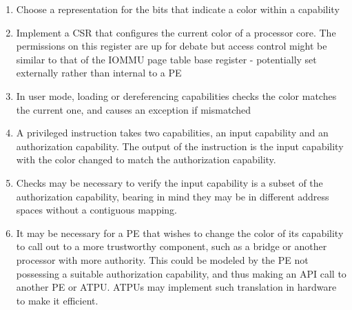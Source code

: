 \begin{enumerate}
\item Choose a representation for the bits that indicate a color within a capability
\item Implement a CSR that configures the current color of a processor core.  The
permissions on this register are up for debate but access control might be
similar to that of the IOMMU page table base register - potentially
set externally rather than internal to a PE
\item In user mode, loading or dereferencing capabilities checks the color
matches the current one, and causes an exception if mismatched
\item A privileged instruction takes two capabilities, an input capability
and an authorization capability.  The output of the instruction is the input
capability with the color changed to match the authorization capability. 
\item Checks may be necessary to verify the input capability is a subset of the
authorization capability, bearing in mind they may be in different address
spaces without a contiguous mapping.
\item It may be necessary for a PE that wishes to change the color of its
capability to call out to a more trustworthy component, such as a bridge or
another processor with more authority.  This could be modeled by the PE not
possessing a suitable authorization capability, and thus making an API call to
another PE or ATPU.  ATPUs may implement such translation in hardware to
make it efficient.
\end{enumerate}
